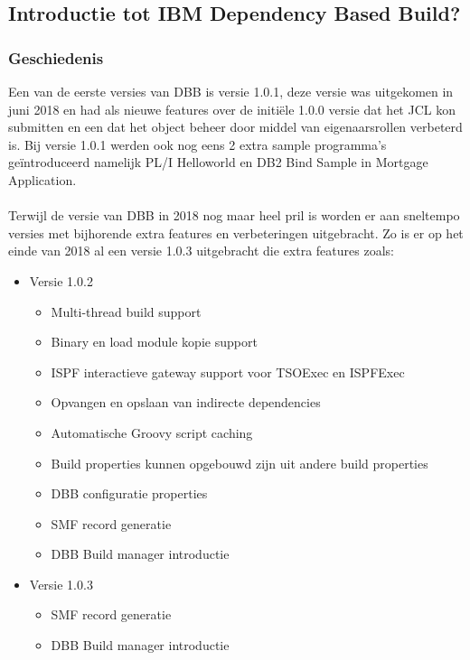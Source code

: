 \subsection{Introductie tot IBM Dependency Based Build?}
\subsubsection{Geschiedenis}
Een van de eerste versies van DBB is versie 1.0.1, deze versie was uitgekomen in juni 2018 en had als nieuwe features over de initiële 1.0.0 versie dat het JCL kon submitten en een dat het object beheer door middel van eigenaarsrollen verbeterd is. Bij versie 1.0.1 werden ook nog eens 2 extra sample programma's geïntroduceerd namelijk PL/I Helloworld en DB2 Bind Sample in Mortgage Application.
\\ \\
Terwijl de versie van DBB in 2018 nog maar heel pril is worden er aan sneltempo versies met bijhorende extra features en verbeteringen uitgebracht. Zo is er op het einde van 2018 al een versie 1.0.3 uitgebracht die extra features zoals:
\begin{itemize}
    \item Versie 1.0.2
    \begin{itemize}
        \item Multi-thread build support
        \item Binary en load module kopie support
        \item ISPF interactieve gateway support voor TSOExec en ISPFExec
        \item Opvangen en opslaan van indirecte dependencies
        \item Automatische Groovy script caching
        \item Build properties kunnen opgebouwd zijn uit andere build properties
        \item DBB configuratie properties
        \item SMF record generatie
        \item DBB Build manager introductie
    \end{itemize}
    \item Versie 1.0.3
    \begin{itemize}
        \item SMF record generatie
        \item DBB Build manager introductie
    \end{itemize}

\end{itemize}
